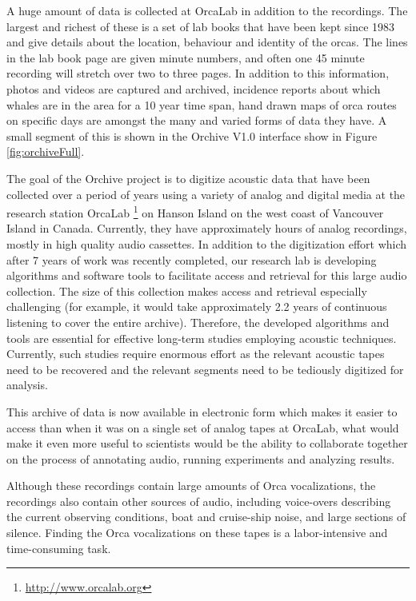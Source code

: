 \documentclass[12pt,oneside]{book}
\begin{document}
A huge amount of data is collected at OrcaLab in addition to the
recordings.  The largest and richest of these is a set of lab books
that have been kept since 1983 and give details about the location,
behaviour and identity of the orcas.  The lines in the lab book page
are given minute numbers, and often one 45 minute recording will
stretch over two to three pages.  In addition to this information,
photos and videos are captured and archived, incidence reports about
which whales are in the area for a 10 year time span, hand drawn maps
of orca routes on specific days are amongst the many and varied forms
of data they have.  A small segment of this is shown in the Orchive
V1.0 interface show in Figure \ref{fig:orchiveFull}.

The goal of the Orchive project is to digitize acoustic data that have
been collected over a period of \totalYearsOrcaLabCollecting years
using a variety of analog and digital media at the research station
OrcaLab \footnote{\url{http://www.orcalab.org}} on Hanson Island on
the west coast of Vancouver Island in Canada.  Currently, they have
approximately \aboutHoursOfOrchiveRecordings hours of analog
recordings, mostly in high quality audio cassettes. In addition to the
digitization effort which after 7 years of work was recently
completed, our research lab is developing algorithms and software
tools to facilitate access and retrieval for this large audio
collection.  The size of this collection makes access and retrieval
especially challenging (for example, it would take approximately 2.2
years of continuous listening to cover the entire archive).
Therefore, the developed algorithms and tools are essential for
effective long-term studies employing acoustic techniques. Currently,
such studies require enormous effort as the relevant acoustic tapes
need to be recovered and the relevant segments need to be tediously
digitized for analysis.

This archive of data is now available in electronic form which makes
it easier to access than when it was on a single set of analog tapes
at OrcaLab, what would make it even more useful to scientists would be
the ability to collaborate together on the process of annotating
audio, running experiments and analyzing results.

Although these recordings contain large amounts of Orca vocalizations,
the recordings also contain other sources of audio, including
voice-overs describing the current observing conditions, boat and
cruise-ship noise, and large sections of silence.  Finding the Orca
vocalizations on these tapes is a labor-intensive and time-consuming
task.
\end{document}
